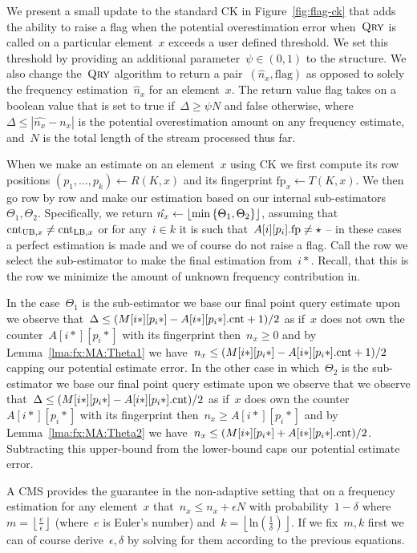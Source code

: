 {We present a small update to the standard CK in Figure~\ref{fig:flag-ck} that adds the ability to raise a flag when the potential overestimation error when~$\textnormal{\textsc{Qry}}$ is called on a particular element~$x$ exceeds a user defined threshold. We set this threshold by providing an additional parameter~$\psi \in \left( 0,1 \right)$ to the structure. We also change the~$\textnormal{\textsc{Qry}}$ algorithm to return a pair~$(\hat{n}_x,\text{flag})$ as opposed to solely the frequency estimation~$\hat{n}_x$ for an element~$x$. The return value flag takes on a boolean value that is set to true if~$\Delta \geq \psi N$ and false otherwise, where~$\Delta \leq |\hat{n_x} - n_x|$ is the potential overestimation amount on any frequency estimate, and~$N$ is the total length of the stream processed thus far. 

When we make an estimate on an element~$x$ using CK we first compute its row positions $(p_1,\ldots,p_k) \gets R(K,x)$  and its fingerprint $\text{fp}_x \gets T(K,x)$. We then go row by row and make our estimation based on our internal sub-estimators $\Theta_1,\Theta_2$. Specifically, we return $\hat{n_x} \gets \floor(\min\left\{ \Theta_1, \Theta_2 \right\})$, assuming that $\textup{cnt}_{\text{UB},x} \neq \textup{cnt}_{\text{LB},x}$ or for any~$i \in k$ it is such that~$A[i][p_i].\textup{fp} \neq \star$ -- in these cases a perfect estimation is made and we of course do not raise a flag. Call the row we select the sub-estimator to make the final estimation from~$i*$. Recall, that this is the row we minimize the amount of unknown frequency contribution in. 

In the case~$\Theta_1$ is the sub-estimator we base our final point query estimate upon we observe that~$\Delta 
\leq (M[i*][p_i*] - A[i*][p_i*].\textup{cnt}+1)/2$ as if~$x$ does not own the counter~$A[i*][p_i*]$ with its fingerprint then~$n_x \geq 0$ and by Lemma~\ref{lma:fx:MA:Theta1} we have~$n_x \leq (M[i*][p_i*] - A[i*][p_i*].\textup{cnt}+1)/2$ capping our potential estimate error. In the other case in which~$\Theta_2$ is the sub-estimator we base our final point query estimate upon we observe that we observe that~$\Delta \leq (M[i*][p_i*] - A[i*][p_i*].\textup{cnt})/2$ as if~$x$ does own the counter~$A[i*][p_i*]$ with its fingerprint then~$n_x \geq A[i*][p_i*]$ and by Lemma~\ref{lma:fx:MA:Theta2} we have~$n_x \leq (M[i*][p_i*] + A[i*][p_i*].\textup{cnt})/2$. Subtracting this upper-bound from the lower-bound caps our potential estimate error.

A CMS provides the guarantee in the non-adaptive setting that on a frequency estimation for any element~$x$ that~$\hat{n}_x \leq n_x + \epsilon N$ with probability~$1 - \delta$ where~$m = \left \lfloor\frac{e}{\epsilon}\right \rfloor$ (where~$e$ is Euler's number) and~$k = \left \lfloor \mathrm{ln}(\frac{1}{\delta}) \right \rfloor$. If we fix~$m,k$ first we can of course derive~$\epsilon,\delta$ by solving for them according to the previous equations. }
